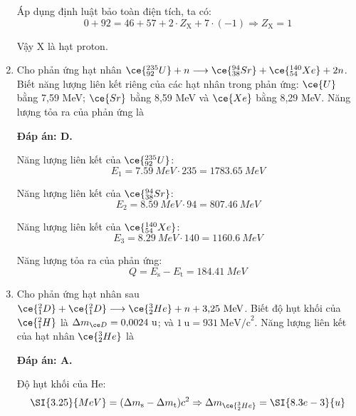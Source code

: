 \begin{enumerate}[label=\bfseries Câu \arabic*:]
{		Áp dụng định luật bảo toàn điện tích, ta có:
		$$0 + 92 = 46 + 57 + 2 \cdot Z_{\text{X}} + 7 \cdot (-1) \Rightarrow Z_{\text{X}} = 1$$
		
		Vậy X là hạt proton.
		
	}
	

	\item {}
	\cauhoi
	{Cho phản ứng hạt nhân $\ce{^{235}_{92} U} + n \longrightarrow \ce{^{94}_{38} Sr} + \ce{^{140}_{54} Xe} + 2n$. Biết năng lượng liên kết riêng của các hạt nhân trong phản ứng: $\ce{U}$ bằng 7,59 MeV; $\ce{Sr}$ bằng 8,59 MeV và $\ce{Xe}$ bằng 8,29 MeV. Năng lượng tỏa ra của phản ứng là
	}
	
	\loigiai
	{		\textbf{Đáp án: D.}
		
		Năng lượng liên kết của $\ce{^{235}_{92} U}$:
		$$E_1 = \SI{7.59}{MeV} \cdot 235 = \SI{1783.65}{MeV}$$
		
		Năng lượng liên kết của $\ce{^{94}_{38} Sr}$:
		$$E_2 = \SI{8.59}{MeV} \cdot 94 = \SI{807.46}{MeV}$$
		
		Năng lượng liên kết của $\ce{^{140}_{54} Xe}$:
		$$E_3 = \SI{8.29}{MeV} \cdot 140 = \SI{1160.6}{MeV}$$
		
		Năng lượng tỏa ra của phản ứng:
		$$Q=E_\text{s} - E_\text{t} = \SI{184.41}{MeV}$$
		
	}
	\item {}
	\cauhoi
	{Cho phản ứng hạt nhân sau $\ce{^2_1 D} + \ce{^2_1 D} \longrightarrow \ce{^3_2 He} + n + \text{3,25}\ \text{MeV}$. Biết độ hụt khối của $\ce{^2_1 H}$ là $\Delta m_{\ce D} = \text{0,0024}\ \text{u}$; và $1\ \text{u} = 931\ \text{MeV/c}^2$. Năng lượng liên kết của hạt nhân $\ce{^3_2 He}$ là
	}
	
	\loigiai
	{		\textbf{Đáp án: A.}
		
	Độ hụt khối của He:
		$$\SI{3.25}{MeV} = (\Delta m_\text{s} - \Delta m_\text{t} )c^2 \Rightarrow \Delta m_{\ce{^3_2 He}} = \SI{8.3e-3}{u}$$
		
}
\end{enumerate}
